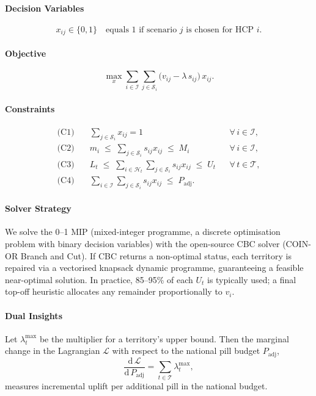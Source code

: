 \paragraph{Decision Variables}
\[
  x_{ij} \in \{0,1\}
  \quad\text{equals 1 if scenario \(j\) is chosen for HCP \(i\).}
\]

\paragraph{Objective}
\[
  \max_{x}
    \sum_{i\in\mathcal I}\sum_{j\in\mathcal S_i}
      \bigl(v_{ij}-\lambda\,s_{ij}\bigr)\,x_{ij}.
\]

\paragraph{Constraints}
\begin{align}
\text{(C1)}\quad & \sum_{j\in\mathcal S_i} x_{ij} = 1
  && \forall\,i\in\mathcal I, \nonumber\\
\text{(C2)}\quad & m_i \;\le\;\sum_{j\in\mathcal S_i} s_{ij}x_{ij}\;\le\;M_i
  && \forall\,i\in\mathcal I, \nonumber\\
\text{(C3)}\quad & L_t \;\le\;\sum_{i\in\mathcal H_t}\sum_{j\in\mathcal S_i} s_{ij}x_{ij}\;\le\;U_t
  && \forall\,t\in\mathcal T, \nonumber\\
\text{(C4)}\quad & \sum_{i\in\mathcal I}\sum_{j\in\mathcal S_i} s_{ij}x_{ij}
  \;\le\; P_{\mathrm{adj}}. \nonumber
\end{align}

\paragraph{Solver Strategy}
We solve the 0--1 MIP (mixed-integer programme, a discrete optimisation problem with binary decision variables) with the open-source CBC solver (COIN-OR Branch and Cut). If CBC returns a non-optimal status, each territory is repaired via a vectorised knapsack dynamic programme, guaranteeing a feasible near-optimal solution. In practice, 85--95\% of each \( U_t \) is typically used; a final top-off heuristic allocates any remainder proportionally to \( v_i \).

\paragraph{Dual Insights}
Let \(\lambda_t^{\max}\) be the multiplier for a territory's upper bound. Then the marginal change in the Lagrangian \(\mathcal L\) with respect to the national pill budget \(P_{\mathrm{adj}}\),
\[
  \frac{\mathrm{d}\,\mathcal L}{\mathrm{d}\,P_{\mathrm{adj}}}
    = \sum_{t\in\mathcal T} \lambda_t^{\max},
\]
measures incremental uplift per additional pill in the national budget.


